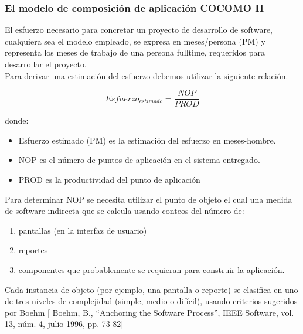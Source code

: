 \subsubsection{El modelo de composición de aplicación COCOMO II }
El esfuerzo necesario para concretar un proyecto de desarrollo de software, cualquiera sea el
modelo empleado, se expresa en meses/persona (PM) y representa los meses de trabajo de una
persona fulltime, requeridos para desarrollar el proyecto.\\
Para derivar una estimación del esfuerzo debemos utilizar la siguiente relación.


\[ Esfuerzo_{estimado} = \frac{NOP}{PROD}\]

donde:
\begin{itemize}
	\item Esfuerzo estimado (PM) es la estimación del esfuerzo en meses-hombre. 
	\item NOP es el número de puntos de aplicación en el sistema entregado. 
	\item PROD es la productividad del punto de aplicación	
\end{itemize}


Para determinar NOP se necesita utilizar el punto de objeto el cual una medida de software indirecta que se calcula usando conteos del número de:
\begin{enumerate}
	\item pantallas (en la interfaz de usuario)
	\item reportes 
	\item componentes que probablemente se requieran para construir la aplicación.
\end{enumerate}

Cada instancia de objeto (por ejemplo, una pantalla o reporte) se clasifica en uno de tres niveles de complejidad (simple, medio o difícil), usando criterios sugeridos por Boehm [ Boehm, B., “Anchoring the Software Process”, IEEE Software, vol. 13, núm. 4, julio 1996, pp. 73-82]



